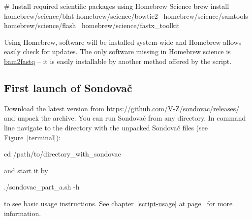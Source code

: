 \documentclass[a4paper, 11pt, twoside]{article}
\begin{document}
\begin{bashcode}
  # Install required scientific packages using Homebrew Science
  brew install homebrew/science/blat homebrew/science/bowtie2 \
    homebrew/science/samtools homebrew/science/flash \
    homebrew/science/fastx_toolkit
\end{bashcode}

Using Homebrew, software will be installed system-wide and Homebrew allows easily check for updates. The only software missing in Homebrew science is \href{http://gsl.hudsonalpha.org/information/software/bam2fastq}{bam2fastq} -- it is easily installable by another method offered by the script.

\subsection{First launch of Sondovač}
\label{script-start}

Download the latest version from \href{https://github.com/V-Z/sondovac/releases/}{https://github.com/V-Z/sondovac/releases/} and unpack the archive. You can run Sondovač from any directory. In command line navigate to the directory with the unpacked Sondovač files (see Figure~\ref{terminal}):

\begin{bashcode}
  cd /path/to/directory_with_sondovac
\end{bashcode}

and start it by

\begin{bashcode}
  ./sondovac_part_a.sh -h
\end{bashcode}

to see basic usage instructions. See chapter~\ref{script-usage} at page~\pageref{script-usage} for more information.
\end{document}
